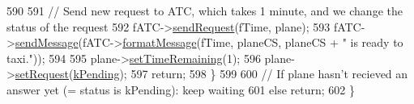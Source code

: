 \begin{DoxyCode}
590 
591         \textcolor{comment}{// Send new request to ATC, which takes 1 minute, and we change the status of the request}
592         fATC->\hyperlink{classATC_aaabbddfb988289b786b18ba8f50510f2}{sendRequest}(fTime, plane);
593         fATC->\hyperlink{classATC_aa78b32354d28f3f2eac0143df617283b}{sendMessage}(fATC->\hyperlink{classATC_a2fca67fc154c7d8a6c14198697653059}{formatMessage}(fTime, planeCS, planeCS + \textcolor{stringliteral}{" is ready
       to taxi."}));
594 
595         plane->\hyperlink{classAirplane_a43e7b856df001168956ed6d115943ec9}{setTimeRemaining}(1);
596         plane->\hyperlink{classAirplane_affcc5325670824881ccc1524223aa209}{setRequest}(\hyperlink{Airplane_8h_a4a8a3f45932bdf601f093bea061bad9bad143035084d581f7aecfabd95652e62c}{kPending});
597         \textcolor{keywordflow}{return};
598     \}
599 
600         \textcolor{comment}{// If plane hasn't recieved an answer yet (= status is kPending): keep waiting}
601     \textcolor{keywordflow}{else} \textcolor{keywordflow}{return};
602 \}
\end{DoxyCode}
